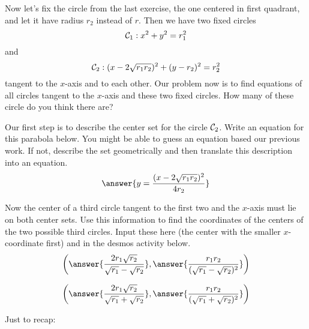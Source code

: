 \documentclass{ximera}
\begin{document}
\begin{exploration}   \label{Ex2434634:Spheres}
Now let's fix the circle from the last exercise, the one centered in first quadrant, and let it have radius $r_2$ instead of $r$. Then we have two fixed circles
\[
   {\cal C}_1: x^2 + y^2 = r_1^2
\]
and
\[
  {\cal C}_2:  (x-2\sqrt{r_1r_2})^2 + (y-r_2)^2 = r_2^2
\]
tangent to the $x$-axis and to each other. Our problem now is to find equations of all circles tangent to the $x$-axis and these two fixed circles. How many of these circle do you think there are?


\begin{question}   \label{Q5693:Spheres}
Our first step is to describe the center set for the circle ${\cal C}_2$. Write an equation for this parabola below. You might be able to guess an equation based our previous work. If not, describe the set geometrically and then translate this description into an equation. 
\[
    \answer{y=\frac{(x-2\sqrt{r_1r_2})^2}{4r_2}}
\]
\end{question}

Now the center of a third circle tangent to the first two and the $x$-axis must lie on both center sets. Use this information to find the coordinates of the centers of the two possible third circles. Input these here (the center with the smaller $x$-coordinate first) and in the desmos activity below.
\[
   \left( \answer{\frac{2r_1\sqrt{r_2}}{\sqrt{r_1} -\sqrt{r_2}}} , \answer{\frac{r_1 r_2}{(\sqrt{r_1} -\sqrt{r_2})^2}}  \right) 
\]

\[
   \left( \answer{\frac{2r_1\sqrt{r_2}}{\sqrt{r_1} +\sqrt{r_2}}} , \answer{\frac{r_1 r_2}{(\sqrt{r_1} +\sqrt{r_2})^2}}  \right) 
\]


 
\begin{onlineOnly}
    \begin{center}
\end{center}
\end{onlineOnly}
\end{exploration}

Just to recap:
\end{document}
